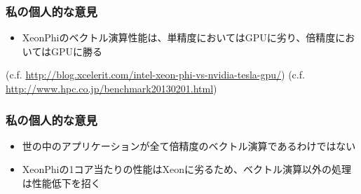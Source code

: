\documentclass[dvipdfmx,20pt,notheorems,t]{beamer}
\begin{document}
\begin{frame}\frametitle{私の個人的な意見}
\begin{itemize}
\item XeonPhiのベクトル演算性能は、単精度においてはGPUに劣り、倍精度においてはGPUに勝る
\end{itemize}
\small
(c.f. \url{http://blog.xcelerit.com/intel-xeon-phi-vs-nvidia-tesla-gpu/})
(c.f. \url{http://www.hpc.co.jp/benchmark20130201.html})
\end{frame}

\begin{frame}\frametitle{私の個人的な意見}
\begin{itemize}
\item 世の中のアプリケーションが全て倍精度のベクトル演算であるわけではない
\item XeonPhiの1コア当たりの性能はXeonに劣るため、ベクトル演算以外の処理は性能低下を招く
\end{itemize}
\end{frame}
\end{document}
